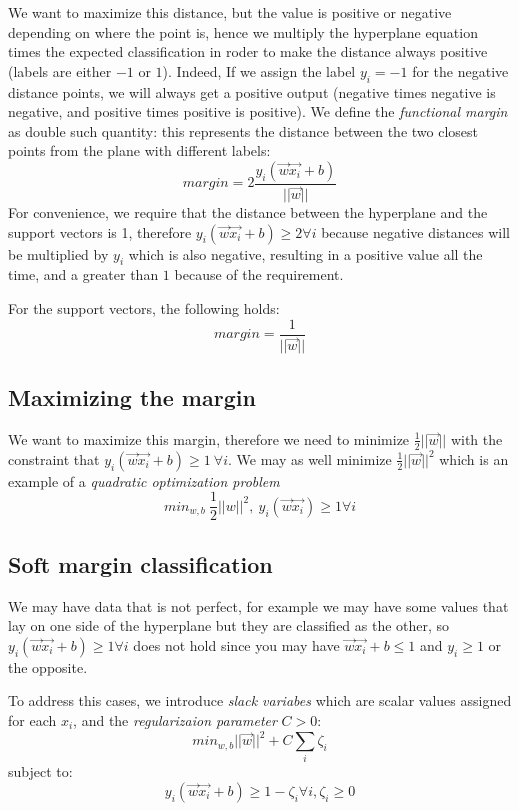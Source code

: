 \documentclass{article}
\begin{document}
We want to maximize this distance, but the value is positive or negative
depending on where the point is, hence we multiply the hyperplane
equation times the expected classification in roder to make the distance
always positive (labels are either \(-1\) or \(1\)). Indeed, If we
assign the label \(y_i=-1\) for the negative distance points, we will
always get a positive output (negative times negative is negative, and
positive times positive is positive). We define the \emph{functional
margin} as double such quantity: this represents the distance between
the two closest points from the plane with different labels:
\[margin = 2\frac{y_i(\vec{w}\vec{x_i}+b)}{||\vec{w}||}\] For
convenience, we require that the distance between the hyperplane and the
support vectors is 1, therefore
\(y_i(\vec{w}\vec{x_i}+b) \ge 2 \forall i\) because negative distances
will be multiplied by \(y_i\) which is also negative, resulting in a
positive value all the time, and a greater than \(1\) because of the
requirement.

For the support vectors, the following holds:
\[margin = \frac{1}{||\vec{w}||}\]

\subsection{Maximizing the margin}\label{maximizing-the-margin}

We want to maximize this margin, therefore we need to minimize
\(\frac{1}{2}||\vec{w}||\) with the constraint that
\(y_i(\vec{w}\vec{x_i}+b) \ge 1\ \forall i\). We may as well minimize
\(\frac{1}{2}||\vec{w}||^2\) which is an example of a \emph{quadratic
optimization problem}
\[ min_{w, b}\ \frac{1}{2} ||w||^2,\ y_i(\vec{w}\vec{x_i}) \ge 1 \forall i \]

\subsection{Soft margin
classification}\label{soft-margin-classification}

We may have data that is not perfect, for example we may have some
values that lay on one side of the hyperplane but they are classified as
the other, so \(y_i(\vec{w}\vec{x_i}+b) \ge 1 \forall i\) does not hold
since you may have \(\vec{w}\vec{x_i}+b \le 1\) and \(y_i \ge 1\) or the
opposite.

To address this cases, we introduce \emph{slack variabes} which are
scalar values assigned for each \(x_i\), and the \emph{regularizaion
parameter} \(C > 0\):
\[ min_{w, b} ||\vec{w}||^2 + C \sum_{i} \zeta_i \] subject to:
\[y_i(\vec{w}\vec{x_i} + b) \ge 1 - \zeta_i \forall i, \zeta_i \ge 0\]
\end{document}
